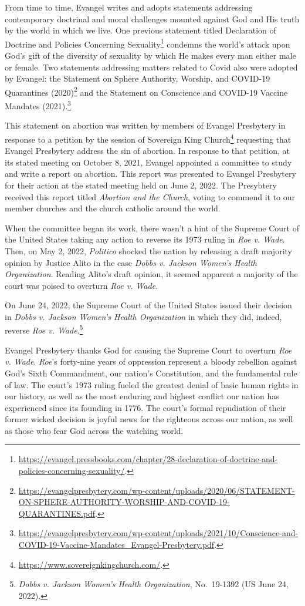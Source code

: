 \documentclass[
]{book}
\begin{document}
From time to time, Evangel writes and adopts statements addressing contemporary doctrinal and moral challenges mounted against God and His truth by the world in which we live. One previous statement titled Declaration of Doctrine and Policies Concerning Sexuality\footnote{\url{https://evangel.pressbooks.com/chapter/28-declaration-of-doctrine-and-policies-concerning-sexuality/}.} condemns the world's attack upon God's gift of the diversity of sexuality by which He makes every man either male or female. Two statements addressing matters related to Covid also were adopted by Evangel: the Statement on Sphere Authority, Worship, and COVID-19 Quarantines (2020)\footnote{\url{https://evangelpresbytery.com/wp-content/uploads/2020/06/STATEMENT-ON-SPHERE-AUTHORITY-WORSHIP-AND-COVID-19-QUARANTINES.pdf}.} and the Statement on Conscience and COVID-19 Vaccine Mandates (2021).\footnote{\url{https://evangelpresbytery.com/wp-content/uploads/2021/10/Conscience-and-COVID-19-Vaccine-Mandates_Evangel-Presbytery.pdf}.}

This statement on abortion was written by members of Evangel Presbytery in response to a petition by the session of Sovereign King Church\footnote{\url{https://www.sovereignkingchurch.com/}.} requesting that Evangel Presbytery address the sin of abortion. In response to that petition, at its stated meeting on October 8, 2021, Evangel appointed a committee to study and write a report on abortion. This report was presented to Evangel Presbytery for their action at the stated meeting held on June 2, 2022. The Presybtery received this report titled \emph{Abortion and the Church}, voting to commend it to our member churches and the church catholic around the world.

When the committee began its work, there wasn't a hint of the Supreme Court of the United States taking any action to reverse its 1973 ruling in \emph{Roe v. Wade}. Then, on May 2, 2022, \emph{Politico} shocked the nation by releasing a draft majority opinion by Justice Alito in the case \emph{Dobbs v. Jackson Women's Health Organization}. Reading Alito's draft opinion, it seemed apparent a majority of the court was poised to overturn \emph{Roe v. Wade}.

On June 24, 2022, the Supreme Court of the United States issued their decision in \emph{Dobbs v. Jackson Women's Health Organization} in which they did, indeed, reverse \emph{Roe v. Wade}.\footnote{\emph{Dobbs v. Jackson Women's Health Organization}, No.~19-1392 (US June 24, 2022).}

Evangel Presbytery thanks God for causing the Supreme Court to overturn \emph{Roe v. Wade}. \emph{Roe}'s forty-nine years of oppression represent a bloody rebellion against God's Sixth Commandment, our nation's Constitution, and the fundamental rule of law. The court's 1973 ruling fueled the greatest denial of basic human rights in our history, as well as the most enduring and highest conflict our nation has experienced since its founding in 1776. The court's formal repudiation of their former wicked decision is joyful news for the righteous across our nation, as well as those who fear God across the watching world.
\end{document}
